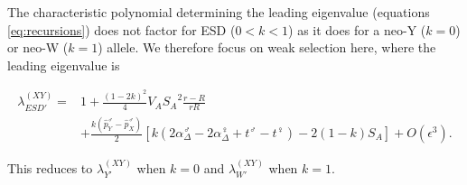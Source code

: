 \documentclass[10pt,letterpaper]{article}
\begin{document}
The characteristic polynomial determining the leading eigenvalue (equations \ref{eq:recursions}) does not factor for ESD ($0<k<1$) as it does for a neo-Y ($k=0$) or neo-W ($k=1$) allele. 
We therefore focus on weak selection here, where the leading eigenvalue is

\begin{equation}
\begin{split}
\lambda_{ESD'}^{(XY)} =& 1 + \frac{{(1-2k)}^2}{4}V_{A}{S_{A}}^2\frac{r-R}{r R} \\
&+\frac{k(\hat{p}^\male_Y-\hat{p}^\male_X)}{2}\left[ k \left(2\alpha_{\Delta}^\male-2\alpha_{\Delta}^\female+t^\male-t^\female \right) -2(1-k)S_{A}\right]+O\left(\epsilon^3\right).
\end{split}
\label{eq:lambda_ESD_k}
\end{equation}

\noindent
This reduces to $\lambda_{Y'}^{(XY)}$ when $k=0$ and $\lambda_{W'}^{(XY)}$ when $k=1$. 
\end{document}
